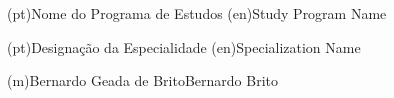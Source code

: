 \ntdegreename*(pt){Nome do Programa de Estudos}
\ntdegreename*(en){Study Program Name}

\ntspecialization*(pt){Designação da Especialidade}
\ntspecialization*(en){Specialization Name}



\ntauthorname(m){Bernardo Geada de Brito}{Bernardo Brito}

